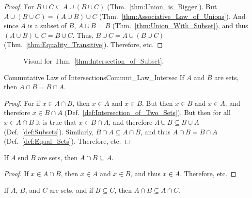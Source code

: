         \begin{proof}
            For $B\cup{C}\subseteq{A}\cup(B\cup{C})$
            (Thm.~\ref{thm:Union_is_Bigger}). But
            $A\cup(B\cup{C})=(A\cup{B})\cup{C}$
            (Thm.~\ref{thm:Associative_Law_of_Unions}).
            And since $A$ is a subset of $B$, $A\cup{B}=B$
            (Thm.~\ref{thm:Union_With_Subset}), and thus
            $(A\cup{B})\cup{C}=B\cup{C}$. Thus, $B\cup{C}=A\cup(B\cup{C})$
            (Thm.~\ref{thm:Equality_Transitive}). Therefore, etc.
        \end{proof}
        \begin{figure}[H]
            \centering
            \captionsetup{type=figure}
            \centering
            
            \caption{Visual for Thm.~\ref{thm:Intersection_of_Subset}.}
            \label{fig:Union_Intersection_venn_diagram}
        \end{figure}
        \begin{ltheorem}{Commutative Law of Intersections}{Commut_Law_Intersec}
            If $A$ and $B$ are sets, then $A\cap{B}=B\cap{A}$.
        \end{ltheorem}
        \begin{proof}
            For if $x\in{A}\cap{B}$, then $x\in{A}$ and
            $x\in{B}$. But then $x\in{B}$ and $x\in{A}$,
            and therefore $x\in{B}\cap{A}$
            (Def.~\ref{def:Intersection_of_Two_Sets}). But then
            for all $x\in{A}\cap{B}$ it is true that
            $x\in{B}\cap{A}$, and therefore
            $A\cup{B}\subseteq{B}\cup{A}$
            (Def.~\ref{def:Subsets}). Similarly,
            $B\cap{A}\subseteq{A}\cap{B}$, and thus
            $A\cap{B}=B\cap{A}$ (Def.~\ref{def:Equal_Sets}).
            Therefore, etc.
        \end{proof}
        \begin{theorem}
            \label{thm:Intersection_is_Smaller}%
            If $A$ snd $B$ are sets, then
            $A\cap{B}\subseteq{A}$.
        \end{theorem}
        \begin{proof}
            If $x\in{A}\cap{B}$, then $x\in{A}$ and
            $x\in{B}$, and thus $x\in{A}$. Therefore, etc.
        \end{proof}
        \begin{theorem}
            \label{thm:Intersection_with_Lesser_Set}%
            If $A$, $B$, and $C$ are sets, and if
            $B\subseteq{C}$, then
            $A\cap{B}\subseteq{A}\cap{C}$.
        \end{theorem}
